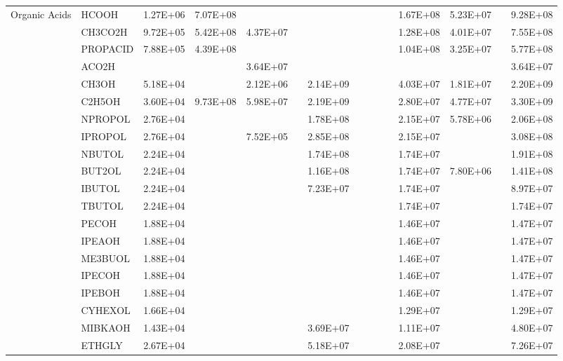 \begin{longtable}{lllllllllllllll}
	\hline \multirow{4}{*}{Organic Acids} & HCOOH & 1.27E+06 & 7.07E+08 &  &  &  &  &  &  &  & 1.67E+08 & 5.23E+07 &  & 9.28E+08 \\
	 & CH3CO2H & 9.72E+05 & 5.42E+08 & 4.37E+07 &  &  &  &  &  &  & 1.28E+08 & 4.01E+07 &  & 7.55E+08 \\
	 & PROPACID & 7.88E+05 & 4.39E+08 &  &  &  &  &  &  &  & 1.04E+08 & 3.25E+07 &  & 5.77E+08 \\
	 & ACO2H &  &  & 3.64E+07 &  &  &  &  &  &  &  &  &  & 3.64E+07 \\
	\hline \parbox[t]{2mm}{} & CH3OH & 5.18E+04 &  & 2.12E+06 &  & 2.14E+09 &  &  &  &  & 4.03E+07 & 1.81E+07 &  & 2.20E+09 \\*
	 & C2H5OH & 3.60E+04 & 9.73E+08 & 5.98E+07 &  & 2.19E+09 &  &  &  &  & 2.80E+07 & 4.77E+07 &  & 3.30E+09 \\*
	 & NPROPOL & 2.76E+04 &  &  &  & 1.78E+08 &  &  &  &  & 2.15E+07 & 5.78E+06 &  & 2.06E+08 \\*
	 & IPROPOL & 2.76E+04 &  & 7.52E+05 &  & 2.85E+08 &  &  &  &  & 2.15E+07 &  &  & 3.08E+08 \\*
	 & NBUTOL & 2.24E+04 &  &  &  & 1.74E+08 &  &  &  &  & 1.74E+07 &  &  & 1.91E+08 \\
	 & BUT2OL & 2.24E+04 &  &  &  & 1.16E+08 &  &  &  &  & 1.74E+07 & 7.80E+06 &  & 1.41E+08 \\
	 & IBUTOL & 2.24E+04 &  &  &  & 7.23E+07 &  &  &  &  & 1.74E+07 &  &  & 8.97E+07 \\
	 & TBUTOL & 2.24E+04 &  &  &  &  &  &  &  &  & 1.74E+07 &  &  & 1.74E+07 \\
	 & PECOH & 1.88E+04 &  &  &  &  &  &  &  &  & 1.46E+07 &  &  & 1.47E+07 \\
	 & IPEAOH & 1.88E+04 &  &  &  &  &  &  &  &  & 1.46E+07 &  &  & 1.47E+07 \\
	 & ME3BUOL & 1.88E+04 &  &  &  &  &  &  &  &  & 1.46E+07 &  &  & 1.47E+07 \\
	 & IPECOH & 1.88E+04 &  &  &  &  &  &  &  &  & 1.46E+07 &  &  & 1.47E+07 \\
	 & IPEBOH & 1.88E+04 &  &  &  &  &  &  &  &  & 1.46E+07 &  &  & 1.47E+07 \\
	 & CYHEXOL & 1.66E+04 &  &  &  &  &  &  &  &  & 1.29E+07 &  &  & 1.29E+07 \\
	 & MIBKAOH & 1.43E+04 &  &  &  & 3.69E+07 &  &  &  &  & 1.11E+07 &  &  & 4.80E+07 \\
	 & ETHGLY & 2.67E+04 &  &  &  & 5.18E+07 &  &  &  &  & 2.08E+07 &  &  & 7.26E+07 \\

\end{longtable}
